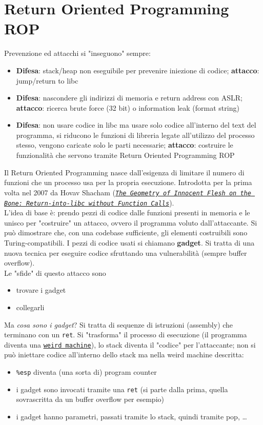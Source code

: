 \section{Return Oriented Programming ROP}

Prevenzione ed attacchi si "inseguono" sempre:
\begin{itemize}
	\item \textbf{Difesa}: stack/heap non eseguibile per prevenire iniezione di codice; \textbf{attacco}: jump/return to libc
	\item \textbf{Difesa}: nascondere gli indirizzi di memoria e return address con ASLR; \textbf{attacco}: ricerca brute force (32 bit) o information leak (format string)
	\item \textbf{Difesa}: non usare codice in libc ma usare solo codice all'interno del text del programma, si riducono le funzioni di libreria legate all'utilizzo del processo stesso, vengono caricate solo le parti necessarie; \textbf{attacco}: costruire le funzionalità che servono tramite Return Oriented Programming ROP
\end{itemize}

Il Return Oriented Programming nasce dall'esigenza di limitare il numero di funzioni che un processo usa per la propria esecuzione. Introdotta per la prima volta nel 2007 da Hovav Shacham (\href{https://www.ush.it/team/ascii/geometry.pdf}{\textit{\texttt{The Geometry of Innocent Flesh on the Bone: Return-into-libc without Function Calls}}}). \\
L'idea di base è: prendo pezzi di codice dalle funzioni presenti in memoria e le unisco per "costruire" un attacco, ovvero il programma voluto dall'attaccante. Si può dimostrare che, con una codebase sufficiente, gli elementi costruibili sono Turing-compatibili.  I pezzi di codice usati si chiamano \textbf{gadget}. Si tratta di una nuova tecnica per eseguire codice sfruttando una vulnerabilità (sempre buffer overflow).\\

Le "sfide" di questo attacco sono 
\begin{itemize}
	\item trovare i gadget
	\item collegarli
\end{itemize}

Ma \textit{cosa sono i gadget}? Si tratta di sequenze di istruzioni (assembly) che terminano con un \texttt{ret}. Si "trasforma" il processo di esecuzione (il programma diventa una \href{https://en.wikipedia.org/wiki/Weird_machine}{\texttt{weird machine}}), lo stack diventa il "codice" per l'attaccante; non si può iniettare codice all'interno dello stack ma nella weird machine descritta:
\begin{itemize}
	\item \texttt{\%esp} diventa (una sorta di) program counter
	\item i gadget sono invocati tramite una \texttt{ret} (si parte dalla prima, quella sovrascritta da un buffer overflow per esempio)
	\item i gadget hanno parametri, passati tramite lo stack, quindi tramite pop, \dots 
\end{itemize}

